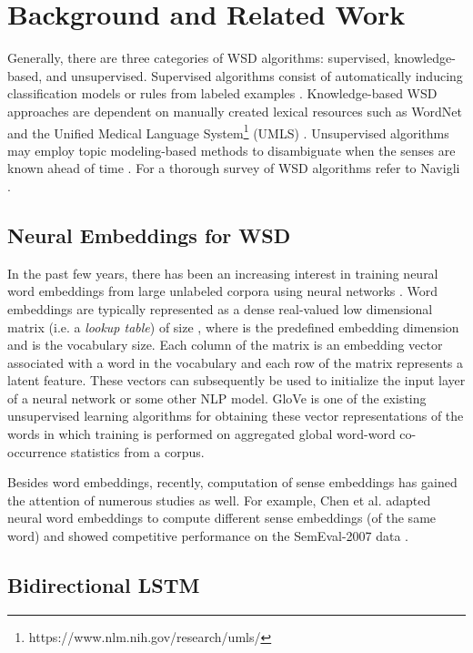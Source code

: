 \documentclass{llncs}
\begin{document}
\section{Background and Related Work}
Generally, there are three categories of WSD algorithms: supervised, knowledge-based, and unsupervised. Supervised algorithms consist of automatically inducing classification models or rules from labeled examples \cite{zhong2010makes}. Knowledge-based WSD approaches are dependent on manually created lexical resources such as WordNet \cite{miller1995wordnet} and the Unified Medical Language System\footnote{https://www.nlm.nih.gov/research/umls/} (UMLS) \cite{pesaranghader2014word}. Unsupervised algorithms may employ topic modeling-based methods to disambiguate when the senses are known ahead of time \cite{kim2015link}. For a thorough survey of WSD algorithms refer to Navigli \cite{navigli2009word}.

\subsection{Neural Embeddings for WSD}
In the past few years, there has been an increasing interest in training neural word embeddings from large unlabeled corpora using neural networks \cite{collobert2008unified}\cite{mikolov2013efficient}. Word embeddings are typically represented as a dense real-valued low dimensional matrix  (i.e. a \textit{lookup table}) of size , where  is the predefined embedding dimension and  is the vocabulary size. Each column of the matrix is an embedding vector associated with a word in the vocabulary and each row of the matrix represents a latent feature. These vectors can subsequently be used to initialize the input layer of a neural network or some other NLP model. GloVe \cite{pennington2014glove} is one of the existing unsupervised learning algorithms for obtaining these vector representations of the words in which training is performed on aggregated global word-word co-occurrence statistics from a corpus.

Besides word embeddings, recently, computation of sense embeddings has gained the attention of numerous studies as well. For example, Chen et al. \cite{chen2014unified} adapted neural word embeddings to compute different sense embeddings (of the same word) and showed competitive performance on the SemEval-2007 data \cite{navigli2007semeval}.

\subsection{Bidirectional LSTM}
\end{document}
